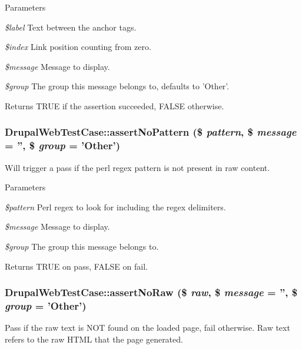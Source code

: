 \begin{DoxyParams}{Parameters}
\item[{\em \$label}]Text between the anchor tags. \item[{\em \$index}]Link position counting from zero. \item[{\em \$message}]Message to display. \item[{\em \$group}]The group this message belongs to, defaults to 'Other'. \end{DoxyParams}
\begin{DoxyReturn}{Returns}
TRUE if the assertion succeeded, FALSE otherwise. 
\end{DoxyReturn}
\hypertarget{class_drupal_web_test_case_a03d422398b9fc1f8844b7ff7fe468ed5}{
\subsubsection[{assertNoPattern}]{\setlength{\rightskip}{0pt plus 5cm}DrupalWebTestCase::assertNoPattern (\$ {\em pattern}, \/  \$ {\em message} = {\ttfamily ''}, \/  \$ {\em group} = {\ttfamily 'Other'})}}
\label{class_drupal_web_test_case_a03d422398b9fc1f8844b7ff7fe468ed5}
Will trigger a pass if the perl regex pattern is not present in raw content.


\begin{DoxyParams}{Parameters}
\item[{\em \$pattern}]Perl regex to look for including the regex delimiters. \item[{\em \$message}]Message to display. \item[{\em \$group}]The group this message belongs to. \end{DoxyParams}
\begin{DoxyReturn}{Returns}
TRUE on pass, FALSE on fail. 
\end{DoxyReturn}
\hypertarget{class_drupal_web_test_case_ae683aebc33c05b0ba2e7e3f06f4485a9}{
\subsubsection[{assertNoRaw}]{\setlength{\rightskip}{0pt plus 5cm}DrupalWebTestCase::assertNoRaw (\$ {\em raw}, \/  \$ {\em message} = {\ttfamily ''}, \/  \$ {\em group} = {\ttfamily 'Other'})}}
\label{class_drupal_web_test_case_ae683aebc33c05b0ba2e7e3f06f4485a9}
Pass if the raw text is NOT found on the loaded page, fail otherwise. Raw text refers to the raw HTML that the page generated.



